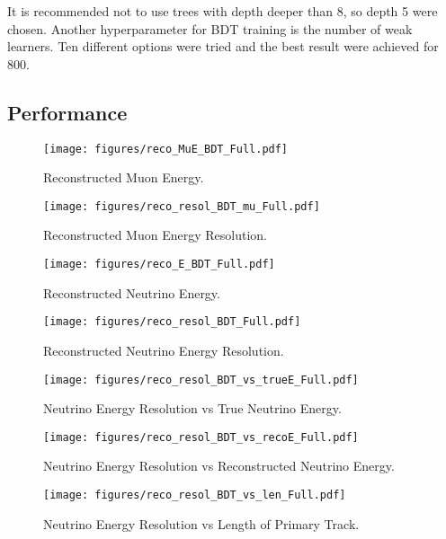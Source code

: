 It is recommended not to use trees with depth deeper than 8, so depth 5 were chosen. Another 
hyperparameter for BDT training is the number of weak learners. Ten different options were tried
and the best result were achieved for 800.

\subsection{Performance}

\begin{figure}[!th]
\centering
\texttt{[image: figures/reco\_MuE\_BDT\_Full.pdf]}
\caption{Reconstructed Muon Energy.}
\label{fig:recoMuE}
\end{figure}

\begin{figure}[!th]
\centering
\texttt{[image: figures/reco\_resol\_BDT\_mu\_Full.pdf]}
\caption{Reconstructed Muon Energy Resolution.}
\label{fig:recoMuE_resol}
\end{figure}

\begin{figure}[!th]
\centering
\texttt{[image: figures/reco\_E\_BDT\_Full.pdf]}
\caption{Reconstructed Neutrino Energy.}
\label{fig:recoE}
\end{figure}

\begin{figure}[!th]
\centering
\texttt{[image: figures/reco\_resol\_BDT\_Full.pdf]}
\caption{Reconstructed Neutrino Energy Resolution.}
\label{fig:recoE}
\end{figure}

\begin{figure}[!th]
\centering
\texttt{[image: figures/reco\_resol\_BDT\_vs\_trueE\_Full.pdf]}
\caption{Neutrino Energy Resolution vs True Neutrino Energy.}
\label{fig:resol_vs_trueE}
\end{figure}

\begin{figure}[!th]
\centering
\texttt{[image: figures/reco\_resol\_BDT\_vs\_recoE\_Full.pdf]}
\caption{Neutrino Energy Resolution vs Reconstructed Neutrino Energy.}
\label{fig:resol_vs_recoE}
\end{figure}

\begin{figure}[!th]
\centering
\texttt{[image: figures/reco\_resol\_BDT\_vs\_len\_Full.pdf]}
\caption{Neutrino Energy Resolution vs Length of Primary Track.}
\label{fig:resol_vs_len}
\end{figure}

